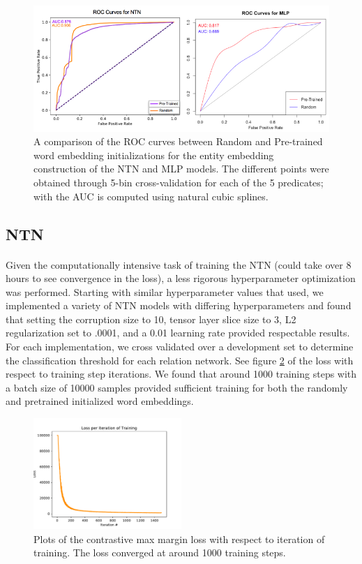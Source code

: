 \documentclass[11.5pt]{article}
\newcounter{graphics}
\begin{document}
\begin{figure}[h!]
\centerline{\includegraphics[width=1\textwidth]{report_mlp/ROC-Curves.png}}
  \caption{\small  A comparison of the ROC curves between Random and Pre-trained word embedding initializations  for the entity embedding construction of the NTN and MLP models. The different points were obtained through 5-bin cross-validation for each of the 5 predicates; with the AUC is computed using natural cubic splines. }
\label{ROC-Curve}
\end{figure}

\subsection{NTN}
\paragraph{} Given the computationally intensive task of training the NTN (could take over 8 hours to see convergence in the loss), a less rigorous hyperparameter optimization was performed. Starting with similar hyperparameter values that  \cite{socher2013reasoning} used, we implemented a variety of NTN models with differing hyperparameters and found that setting the corruption size to 10, tensor layer slice size to 3, L2 regularization set to .0001, and a 0.01 learning rate provided respectable results. For each implementation, we cross validated over a development set to determine the classification threshold for each relation network. See figure \ref{_loss_.pdf} of the loss with respect to training step iterations. We found that around 1000 training steps with a batch size of 10000 samples provided sufficient training for both the randomly and pretrained initialized word embeddings.

 \begin{figure}[h!]
\centerline{\includegraphics[width=0.5\textwidth]{report_ntn/_loss_.pdf}}
  \caption{\small Plots of the contrastive max margin loss with respect to iteration of training. The loss converged at around 1000 training steps. }
\label{_loss_.pdf}
\end{figure}
\end{document}
